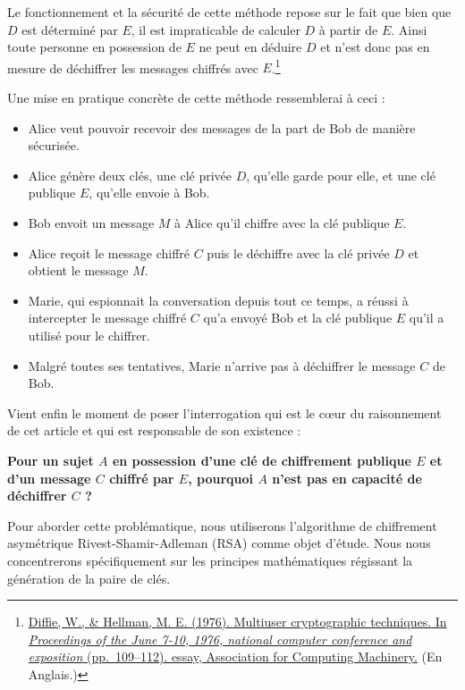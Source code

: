 \documentclass[
  paper=a4,
  ,captions=tableheading
]{scrartcl}
\providecommand{\tightlist}{%
  \setlength{\itemsep}{0pt}\setlength{\parskip}{0pt}}
\begin{document}
Le fonctionnement et la sécurité de cette méthode repose sur le fait que
bien que \(D\) est déterminé par \(E\), il est impraticable de calculer
\(D\) à partir de \(E\). Ainsi toute personne en possession de \(E\) ne
peut en déduire \(D\) et n'est donc pas en mesure de déchiffrer les
messages chiffrés avec \(E\).\footnote{\href{https://dl.acm.org/doi/pdf/10.1145/1499799.1499815}{Diffie,
  W., \& Hellman, M. E. (1976). Multiuser cryptographic techniques. In
  \emph{Proceedings of the June 7-10, 1976, national computer conference
  and exposition} (pp.~109--112). essay, Association for Computing
  Machinery.} (En Anglais.)}

Une mise en pratique concrète de cette méthode ressemblerai à ceci :

\begin{itemize}
\tightlist
\item
  Alice veut pouvoir recevoir des messages de la part de Bob de manière
  sécurisée.
\item
  Alice génère deux clés, une clé privée \(D\), qu'elle garde pour elle,
  et une clé publique \(E\), qu'elle envoie à Bob.
\item
  Bob envoit un message \(M\) à Alice qu'il chiffre avec la clé publique
  \(E\).
\item
  Alice reçoit le message chiffré \(C\) puis le déchiffre avec la clé
  privée \(D\) et obtient le message \(M\).
\item
  Marie, qui espionnait la conversation depuis tout ce temps, a réussi à
  intercepter le message chiffré \(C\) qu'a envoyé Bob et la clé
  publique \(E\) qu'il a utilisé pour le chiffrer.
\item
  Malgré toutes ses tentatives, Marie n'arrive pas à déchiffrer le
  message \(C\) de Bob.
\end{itemize}

Vient enfin le moment de poser l'interrogation qui est le cœur du
raisonnement de cet article et qui est responsable de son existence :

\textbf{Pour un sujet \(A\) en possession d'une clé de chiffrement
publique \(E\) et d'un message \(C\) chiffré par \(E\), pourquoi \(A\)
n'est pas en capacité de déchiffrer \(C\) ?}

Pour aborder cette problématique, nous utiliserons l'algorithme de
chiffrement asymétrique Rivest-Shamir-Adleman (RSA) comme objet d'étude.
Nous nous concentrerons spécifiquement sur les principes mathématiques
régissant la génération de la paire de clés.
\end{document}
